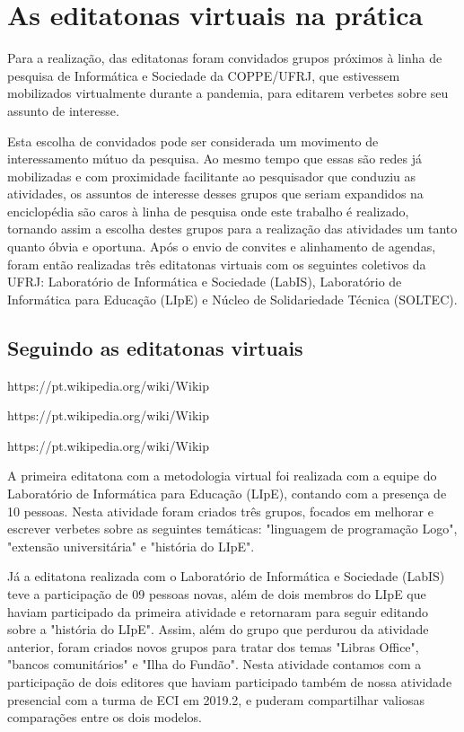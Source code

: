 
\section{As editatonas virtuais na prática}

Para a realização, das editatonas foram convidados grupos próximos à linha de pesquisa de Informática e Sociedade da COPPE/UFRJ, que estivessem mobilizados virtualmente durante a pandemia, para editarem verbetes sobre seu assunto de interesse.

Esta escolha de convidados pode ser considerada um movimento de interessamento mútuo da pesquisa. Ao mesmo tempo que essas são redes já mobilizadas e com proximidade facilitante ao pesquisador que conduziu as atividades, os assuntos de interesse desses grupos que seriam expandidos na enciclopédia são caros à linha de pesquisa onde este trabalho é realizado, tornando assim a escolha destes grupos para a realização das atividades um tanto quanto óbvia e oportuna. Após o envio de convites e alinhamento de agendas, foram então realizadas três editatonas virtuais com os seguintes coletivos da UFRJ: Laboratório de Informática e Sociedade (LabIS), Laboratório de Informática para Educação (LIpE) e Núcleo de Solidariedade Técnica (SOLTEC).
 
\subsection{Seguindo as editatonas virtuais}

https://pt.wikipedia.org/wiki/Wikip%

https://pt.wikipedia.org/wiki/Wikip%

https://pt.wikipedia.org/wiki/Wikip%

A primeira editatona com a metodologia virtual foi realizada com a equipe do Laboratório de Informática para Educação (LIpE), contando com a presença de 10 pessoas. Nesta atividade foram criados três grupos, focados em melhorar e escrever verbetes sobre as seguintes temáticas: "linguagem de programação Logo", "extensão universitária" e "história do LIpE".

Já a editatona realizada com o Laboratório de Informática e Sociedade (LabIS) teve a participação de 09 pessoas novas, além de dois membros do LIpE que haviam participado da primeira atividade e retornaram para seguir editando sobre a "história do LIpE". Assim, além do grupo que perdurou da atividade anterior, foram criados novos grupos para tratar dos temas "Libras Office", "bancos comunitários" e "Ilha do Fundão". Nesta atividade contamos com a participação de dois editores que haviam participado também de nossa atividade presencial com a turma de ECI em 2019.2, e puderam compartilhar valiosas comparações entre os dois modelos.

